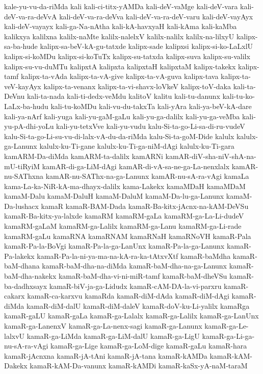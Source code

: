 {kale-yu-vu-da-riMda
kali
kali-ci-titx-yAMDa
kali-deV-vaMge
kali-deV-vara
kali-deV-va-ra-deVvA
kali-deV-va-ra-deVva
kali-deV-va-ra-deV-varu
kali-deV-vayAyx
kali-deV-vayayx
kali-ga-Na-nAtha
kali-kA-havxyaH
kali-kAma
kali-kaMba
kalikxya
kalilxna
kalilx-naMte
kalilx-nalelxV
kalilx-nalilx
kalilx-na-lilxyU
kalipx-sa-ba-hude
kalipx-sa-beV-kA-gu-tatxde
kalipx-sade
kalipxsi
kalipx-si-ko-LaLxlU
kalipx-si-koMDu
kalipx-si-koTuTx
kalipx-su-tatxda
kalipx-suva
kalipx-su-valilx
kalipx-su-vu-duMTu
kalipxtA
kalipxta
kalipxtaH
kalipxtaM
kalipx-takekx
kalipx-tamf
kalipx-ta-vAda
kalipx-ta-vA-give
kalipx-ta-vA-guva
kalipx-tava
kalipx-ta-veV-kayAyx
kalipx-ta-venanx
kalipx-ta-vi-shavx-loVkeV
kalipx-toV-daka
kali-ta-DeVnu
kali-ta-nada
kali-ti-dedx-veMdu
kalitoV
kalitu
kali-tu-danunx
kali-tu-ko-LaLx-ba-hudu
kali-tu-koMDu
kali-vu-du-takxTa
kali-yAra
kali-ya-beV-kA-dare
kali-ya-nArf
kali-yuga
kali-yu-gaM-gaLu
kali-yu-ga-dalilx
kali-yu-ga-veMba
kali-yu-pA-dhi-yoLu
kali-yu-tetxVve
kali-yu-vudu
kalu-Si-ta-go-Li-sa-di-ru-vudeV
kalu-Si-ta-go-Li-su-vu-di-lalx-vA-du-da-riMda
kalu-Si-ta-goM-Dide
kalulx
kalulx-ga-Lanunx
kalulx-ku-Ti-gane
kalulx-ku-Ti-ga-niM-dAgi
kalulx-ku-Ti-gara
kamARM-Da-diMda
kamARM-ta-dalilx
kamARNi
kamAR-diV-sha-niV-shA-na-mU-tiRyiM
kamAR-di-ga-LiM-dAgi
kamAR-di-vA-sa-ne-ga-La-nenxlalx
kamAR-nu-SAThxna
kamAR-nu-SAThx-na-ga-Lanunx
kamAR-nu-sA-ra-vAgi
kamaLa
kama-La-ka-NiR-kA-ma-dhayx-dalilx
kama-Lakekx
kamaMDaH
kamaMDaM
kamaM-Dalu
kamaM-DaluH
kamaM-DaluM
kamaM-Da-lu-ga-Lanunx
kamaM-Da-lushacx
kamaR
kamaR-BAM-Dada
kamaR-Ba-kitx-jAcnx-na-kAM-DeVSu
kamaR-Ba-kitx-ya-lalxde
kamaRM
kamaRM-gaLa
kamaRM-ga-La-Li-dudeV
kamaRM-gaLaM
kamaRM-ga-Lalilx
kamaRM-ga-Lanu
kamaRM-ga-Li-rade
kamaRM-gaLu
kamaRNA
kamaRNAM
kamaRNaH
kamaRNoVH
kamaR-Pala
kamaR-Pa-la-BoVgi
kamaR-Pa-la-ga-LanUnx
kamaR-Pa-la-ga-Lanunx
kamaR-Pa-lakekx
kamaR-Pa-la-ni-ya-ma-na-kA-ra-ka-tAtxvXtf
kamaR-baMdha
kamaR-baM-dhana
kamaR-baM-dha-na-diMda
kamaR-baM-dha-na-ga-Lanunx
kamaR-baM-dha-nakekx
kamaR-baM-dha-vi-ni-miR-tamf
kamaR-baM-dheVSu
kamaR-ba-dadhxsayx
kamaR-biV-ja-ga-Lidudx
kamaR-cAM-DA-la-vi-parxru
kamaR-cakarx
kamaR-ca-karxvu
kamaRda
kamaR-diM-dAda
kamaR-diM-dAgi
kamaR-diMda
kamaR-diM-dalU
kamaR-diM-daleV
kamaR-doV-ku-Li-yalilx
kamaRga
kamaR-gaLU
kamaR-gaLa
kamaR-ga-Lalalx
kamaR-ga-Lalilx
kamaR-ga-LanUnx
kamaR-ga-LanenxV
kamaR-ga-La-nenx-sagi
kamaR-ga-Lanunx
kamaR-ga-Le-lalxvU
kamaR-ga-LiMda
kamaR-ga-LiM-dalU
kamaR-ga-LigU
kamaR-ga-Li-ga-nu-sA-ra-vAgi
kamaR-ga-Lige
kamaR-ga-LoM-dige
kamaR-gaLu
kamaR-hara
kamaR-jAcnxna
kamaR-jA-tAni
kamaR-jA-tana
kamaR-kAMDa
kamaR-kAM-Dakekx
kamaR-kAM-Da-vanunx
kamaR-kAMDi
kamaR-kaSx-yA-naM-taraM
}
